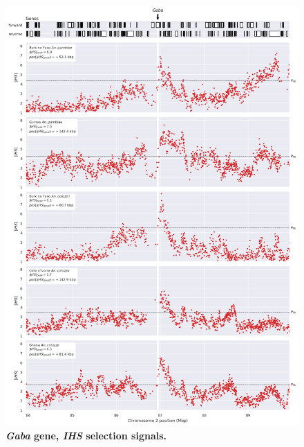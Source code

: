 \documentclass[a4paper,11pt,abstracton,hidelinks]{scrartcl}
\begin{document}
\begin{figure}[t!]
	\begin{center}
		\includegraphics*[width=1\linewidth,center]{artwork/locus_gaba_ihs_pdist.png}
	\end{center}
	\caption[\textit{Gaba} gene, \textit{IHS} selection signals]{
	\textbf{\textit{Gaba} gene, \textit{IHS} selection signals.}
	} 
	\label{fig:locus_gaba_ihs}
\end{figure}


\clearpage
\end{document}
